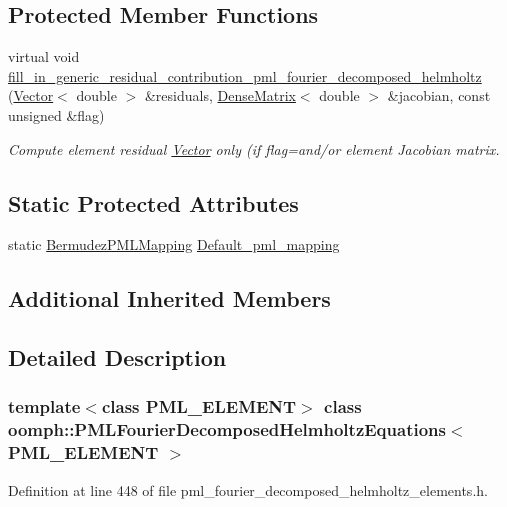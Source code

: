 \subsection*{Protected Member Functions}
\begin{DoxyCompactItemize}
\item 
virtual void \hyperlink{classoomph_1_1PMLFourierDecomposedHelmholtzEquations_a8e8c4b39e2bd4a75b4d71dc92c5c0352}{fill\+\_\+in\+\_\+generic\+\_\+residual\+\_\+contribution\+\_\+pml\+\_\+fourier\+\_\+decomposed\+\_\+helmholtz} (\hyperlink{classoomph_1_1Vector}{Vector}$<$ double $>$ \&residuals, \hyperlink{classoomph_1_1DenseMatrix}{Dense\+Matrix}$<$ double $>$ \&jacobian, const unsigned \&flag)
\begin{DoxyCompactList}\small\item\em Compute element residual \hyperlink{classoomph_1_1Vector}{Vector} only (if flag=and/or element Jacobian matrix. \end{DoxyCompactList}\end{DoxyCompactItemize}
\subsection*{Static Protected Attributes}
\begin{DoxyCompactItemize}
\item 
static \hyperlink{classoomph_1_1BermudezPMLMapping}{Bermudez\+P\+M\+L\+Mapping} \hyperlink{classoomph_1_1PMLFourierDecomposedHelmholtzEquations_af91ab5014bac6a9b90c3f2cb50b5ed60}{Default\+\_\+pml\+\_\+mapping}
\end{DoxyCompactItemize}
\subsection*{Additional Inherited Members}


\subsection{Detailed Description}
\subsubsection*{template$<$class P\+M\+L\+\_\+\+E\+L\+E\+M\+E\+NT$>$\newline
class oomph\+::\+P\+M\+L\+Fourier\+Decomposed\+Helmholtz\+Equations$<$ P\+M\+L\+\_\+\+E\+L\+E\+M\+E\+N\+T $>$}



Definition at line 448 of file pml\+\_\+fourier\+\_\+decomposed\+\_\+helmholtz\+\_\+elements.\+h.



